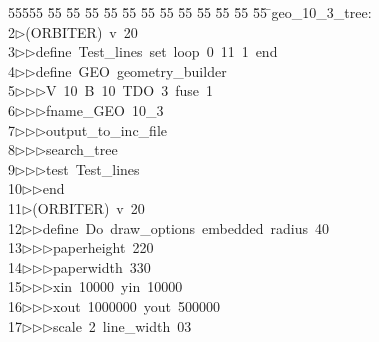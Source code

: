 %
%
\begin{tabbing}
55555 \= 55 \= 55 \= 55 \= 55 \= 55 \= 55 \= 55 \= 55 \= 55 \= 55 \= 55 \= 55 \= \>geo\_10\_3\_tree:\\[0pt]
2\>$\triangleright$\>(ORBITER)\ v\ 20\ \\[0pt]
3\>$\triangleright$\>$\triangleright$\>define\ Test\_lines\ set\ loop\ 0\ 11\ 1\ end\ \\[0pt]
4\>$\triangleright$\>$\triangleright$\>define\ GEO\ geometry\_builder\ \\[0pt]
5\>$\triangleright$\>$\triangleright$\>$\triangleright$\>V\ 10\ B\ 10\ TDO\ 3\ fuse\ 1\ \\[0pt]
6\>$\triangleright$\>$\triangleright$\>$\triangleright$\>fname\_GEO\ 10\_3\ \\[0pt]
7\>$\triangleright$\>$\triangleright$\>$\triangleright$\>output\_to\_inc\_file\ \\[0pt]
8\>$\triangleright$\>$\triangleright$\>$\triangleright$\>search\_tree\ \\[0pt]
9\>$\triangleright$\>$\triangleright$\>$\triangleright$\>test\ Test\_lines\ \\[0pt]
10\>$\triangleright$\>$\triangleright$\>end\\[0pt]
11\>$\triangleright$\>(ORBITER)\ v\ 20\ \\[0pt]
12\>$\triangleright$\>$\triangleright$\>define\ Do\ draw\_options\ embedded\ radius\ 40\ \\[0pt]
13\>$\triangleright$\>$\triangleright$\>$\triangleright$\>paperheight\ 220\ \\[0pt]
14\>$\triangleright$\>$\triangleright$\>$\triangleright$\>paperwidth\ 330\ \\[0pt]
15\>$\triangleright$\>$\triangleright$\>$\triangleright$\>xin\ 10000\ yin\ 10000\ \\[0pt]
16\>$\triangleright$\>$\triangleright$\>$\triangleright$\>xout\ 1000000\ yout\ 500000\ \\[0pt]
17\>$\triangleright$\>$\triangleright$\>$\triangleright$\>scale\ 2\ line\_width\ 03\ \\[0pt]

\end{tabbing}
